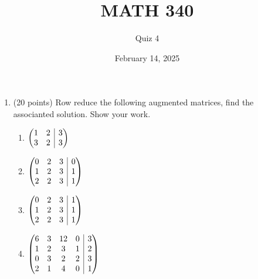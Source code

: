 \documentclass{article}
\makeatletter
\newenvironment{amatrix}[1]{%
  \left(\begin{array}{@{}*{#1}{c}|c@{}}
}{%
  \end{array}\right)
}
\makeatother
\begin{document}
\title{MATH 340}
\author{Quiz 4}
\date{February 14, 2025}
\maketitle

\begin{enumerate}

	\item (20 points) Row reduce the following augmented matrices, find the
	associanted solution. Show your work.

		\begin{enumerate}

			\item

				$\begin{amatrix}{2}
				1 & 2 & 3\\
				3 & 2 & 3\\
				\end{amatrix}$
\vspace{3cm}

			\item 

				$\begin{amatrix}{3}
				0 & 2 & 3 & 0\\
				1 & 2 & 3 & 1\\
				2 & 2 & 3 & 1\\
				\end{amatrix}$

\vspace{3cm}

			\item

				$\begin{amatrix}{3}
				0 & 2 & 3 & 1\\
				1 & 2 & 3 & 1\\
				2 & 2 & 3 & 1\\
				\end{amatrix}$

\vspace{3cm}

			\item

				$\begin{amatrix}{4}
				6 & 3 & 12 & 0 & 3\\
				1 & 2 & 3 & 1 & 2\\
				0 & 3 & 2 & 2 & 3\\
				2 & 1 & 4 & 0 & 1\\
				\end{amatrix}$

		\end{enumerate}

\end{enumerate}
\end{document}
